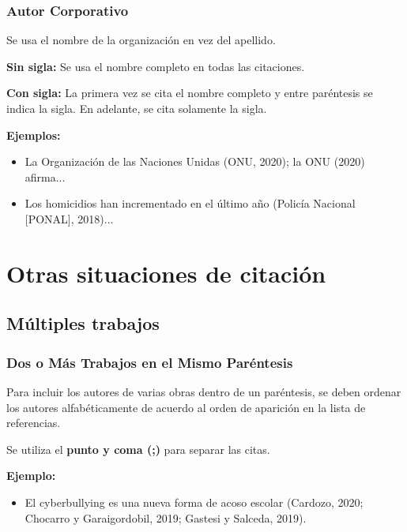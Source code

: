 \documentclass[aspectratio=169]{beamer}
\begin{document}
\begin{frame}
	\frametitle{Autor Corporativo}
	Se usa el nombre de la organización en vez del apellido.
	
	\vspace{1em}
	
	\textbf{Sin sigla:} Se usa el nombre completo en todas las citaciones.
	
	\vspace{1em}
	
	\textbf{Con sigla:} La primera vez se cita el nombre completo y entre paréntesis se indica la sigla. En adelante, se cita solamente la sigla.
	
	\vspace{1em}
	
	\textbf{Ejemplos:}
	\begin{itemize}
		\item La Organización de las Naciones Unidas (ONU, 2020); la ONU (2020) afirma...
		\item Los homicidios han incrementado en el último año (Policía Nacional [PONAL], 2018)...
	\end{itemize}
\end{frame}

\section{Otras situaciones de citación}

\subsection{Múltiples trabajos}

\begin{frame}
	\frametitle{Dos o Más Trabajos en el Mismo Paréntesis}
	Para incluir los autores de varias obras dentro de un paréntesis, se deben ordenar los autores alfabéticamente de acuerdo al orden de aparición en la lista de referencias. 
	
	\vspace{1em}
	
	Se utiliza el \textbf{punto y coma (;)} para separar las citas.
	
	\vspace{1em}
	
	\textbf{Ejemplo:}
	\begin{itemize}
		\item El cyberbullying es una nueva forma de acoso escolar (Cardozo, 2020; Chocarro y Garaigordobil, 2019; Gastesi y Salceda, 2019).
	\end{itemize}
\end{frame}
\end{document}
